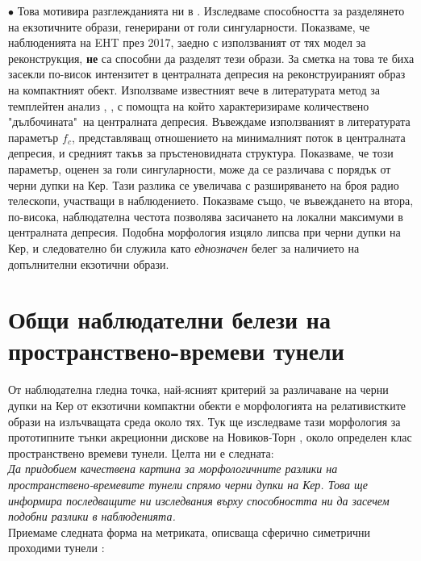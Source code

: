 \documentclass[12pt]{article}
\numberwithin{equation}{section}
\numberwithin{figure}{section}
\begin{document}
	\noindent$\bullet$ Това мотивира разглежданията ни в \cite{Deliyski2024}. Изследваме способността за разделянето на екзотичните образи, генерирани от голи сингуларности. Показваме, че наблюденията на EHT през 2017, заедно с използваният от тях модел за реконструкция, \textbf{не} са способни да разделят тези образи. За сметка на това те биха засекли по-висок интензитет в централната депресия на реконструираният образ на компактният обект. Използваме известният вече в литературата метод за темплейтен анализ \cite{Eichhorn2022}, \cite{Tiede2022}, с помощта на който характеризираме количествено "дълбочината"$\,$ на централната депресия. Въвеждаме използваният в литературата параметър $f_c$, представляващ отношението на минималният поток в централната депресия, и средният такъв за пръстеновидната структура. Показваме, че този параметър, оценен за голи сингуларности, може да се различава с порядък от черни дупки на Кер. Тази разлика се увеличава с разширяването на броя радио телескопи, участващи в наблюдението. Показваме също, че въвеждането на втора, по-висока, наблюдателна честота позволява засичането на локални максимуми в централната депресия. Подобна морфология изцяло липсва при черни дупки на Кер, и следователно би служила като \emph{еднозначен} белег за наличието на допълнителни екзотични образи.\\\newline
	
	\section{Общи наблюдателни белези на пространствено-времеви тунели}
	От наблюдателна гледна точка, най-ясният критерий за различаване на черни дупки на Кер от екзотични компактни обекти е морфологията на релативистките образи на излъчващата среда около тях. Тук ще изследваме тази морфология за прототипните тънки акреционни дискове на Новиков-Торн \cite{Page1973}, около определен клас пространствено времеви тунели. Целта ни е следната:\\
	
	\noindent\emph{Да придобием качествена картина за морфологичните разлики на пространствено-времевите тунели спрямо черни дупки на Кер. Това ще информира последващите ни изследвания върху способността ни да засечем подобни разлики в наблюденията.}\\
	
	\noindent Приемаме следната форма на метриката, описваща сферично симетрични проходими тунели \cite{Morris1988}:
	
\end{document}
